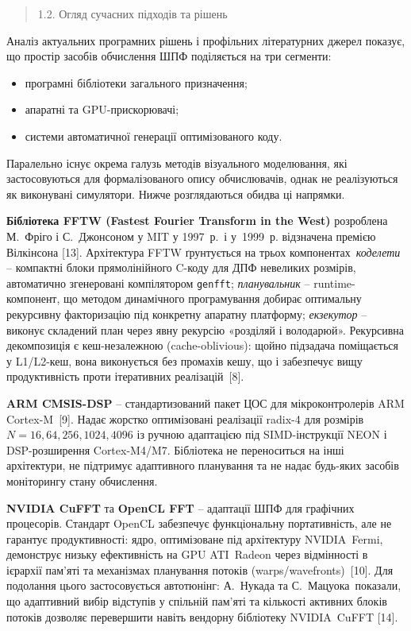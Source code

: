 \documentclass[
]{article}
\begin{document}
\begin{quote}
\protect{}\label{ux43eux433ux43bux44fux434-ux441ux443ux447ux430ux441ux43dux438ux445-ux43fux456ux434ux445ux43eux434ux456ux432-ux442ux430-ux440ux456ux448ux435ux43dux44c}{}1.2.
Огляд сучасних підходів та рішень
\end{quote}

Аналіз актуальних програмних рішень і профільних літературних джерел
показує, що простір засобів обчислення ШПФ поділяється на три сегменти:

\begin{itemize}
\item
  програмні бібліотеки загального призначення;
\item
  апаратні та GPU-прискорювачі;
\item
  системи автоматичної генерації оптимізованого коду.
\end{itemize}

Паралельно існує окрема галузь методів візуального моделювання, які
застосовуються для формалізованого опису обчислювачів, однак не
реалізуються як виконувані симулятори. Нижче розглядаються обидва ці
напрямки.

\textbf{Бібліотека FFTW (Fastest Fourier Transform in the West)}
розроблена М.~Фріго і С.~Джонсоном у MIT у 1997~р.~і у~1999~р.
відзначена премією Вілкінсона {[}13{]}. Архітектура FFTW ґрунтується на
трьох компонентах~\emph{коделети} -- компактні блоки прямолінійного
C-коду для ДПФ невеликих розмірів, автоматично згенеровані компілятором
\texttt{genfft}; \emph{планувальник} -- runtime-компонент, що методом
динамічного програмування добирає оптимальну рекурсивну факторизацію під
конкретну апаратну платформу; \emph{екзекутор} -- виконує складений план
через явну рекурсію «розділяй і володарюй». Рекурсивна декомпозиція є
кеш-незалежною (cache-oblivious): щойно підзадача поміщається у
L1/L2-кеш, вона виконується без промахів кешу, що і забезпечує вищу
продуктивність проти ітеративних реалізацій~{[}8{]}.

\textbf{ARM CMSIS-DSP} -- стандартизований пакет ЦОС для
мікроконтролерів ARM Cortex-M~{[}9{]}. Надає жорстко оптимізовані
реалізації radix-4 для розмірів \(N = 16,64,256,1024,4096\) із ручною
адаптацією під SIMD-інструкції NEON і DSP-розширення Cortex-M4/M7.
Бібліотека не переноситься на інші архітектури, не підтримує адаптивного
планування та не надає будь-яких засобів моніторингу стану обчислення.

\textbf{NVIDIA CuFFT} та \textbf{OpenCL FFT} -- адаптації ШПФ для
графічних процесорів. Стандарт OpenCL забезпечує функціональну
портативність, але не гарантує продуктивності: ядро, оптимізоване під
архітектуру NVIDIA~Fermi, демонструє низьку ефективність на GPU
ATI~Radeon через відмінності в ієрархії пам'яті та механізмах планування
потоків (warps/wavefronts)~{[}10{]}. Для подолання цього застосовується
автотюнінг: А.~Нукада та С.~Мацуока~показали, що адаптивний вибір
відступів у спільній пам'яті та кількості активних блоків потоків
дозволяє перевершити навіть вендорну бібліотеку NVIDIA~CuFFT {[}14{]}.
\end{document}
